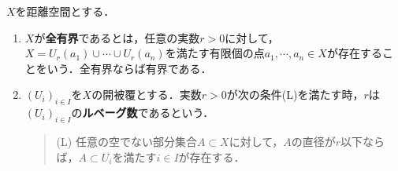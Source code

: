 \documentclass[uplatex,dvipdfmx]{jsreport}
\begin{document}
\begin{definition}\label{def-Lebesgue-number}
    $X$を距離空間とする．
    \begin{enumerate}
        \item $X$が\textbf{全有界}であるとは，任意の実数$r>0$に対して，$X=U_r(a_1)\cup\cdots\cup U_r(a_n)$を満たす有限個の点$a_1,\cdots,a_n\in X$が存在することをいう．全有界ならば有界である．
        \item $(U_i)_{i\in I}$を$X$の開被覆とする．実数$r>0$が次の条件(L)を満たす時，$r$は$(U_i)_{i\in I}$の\textbf{ルベーグ数}であるという．
        \begin{quote}
            (L) 任意の空でない部分集合$A\subset X$に対して，$A$の直径が$r$以下ならば，$A\subset U_i$を満たす$i\in I$が存在する．
        \end{quote}
    \end{enumerate}
\end{definition}
\end{document}

